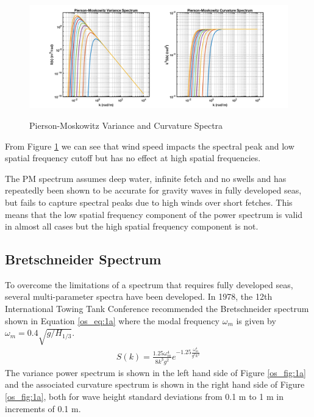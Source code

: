  \begin{figure}[H]
  \begin{center}
\includegraphics[width=6in]{../media/Ocean_Surface/PM_variance_curvature_spectrum.png}
  \end{center}
  \renewcommand{\baselinestretch}{1} \small\normalsize
  \begin{quote}
    \caption[Pierson-Moskowitz Variance and Curvature Spectra]{Pierson-Moskowitz Variance and Curvature Spectra\label{os_fig:1}}
  \end{quote}
\end{figure}
 \renewcommand{\baselinestretch}{2} \small\normalsize
From Figure \ref{os_fig:1} we can see that wind speed impacts the spectral peak and low spatial frequency cutoff but has no effect at high spatial frequencies.
 
The PM spectrum assumes deep water, infinite fetch and no swells and has repeatedly been shown to be accurate for gravity waves in fully developed seas, but fails to capture spectral peaks due to high winds over short fetches. This means that the low spatial frequency component of the power spectrum is valid in almost all cases but the high spatial frequency component is not.

\subsection{Bretschneider Spectrum}
To overcome the limitations of a spectrum that requires fully developed seas, several multi-parameter spectra have been developed. In 1978, the 12th International Towing Tank Conference recommended the Bretschneider spectrum \cite{michel_sea_spectra} shown in Equation \ref{os_eq:1a} where the modal frequency $\omega_m$ is given by $\omega_m = 0.4\sqrt{g/H_{1/3}}$.
\begin{equation}
  \begin{gathered}
  \label{os_eq:1a}
  S(k) = \frac{1.25 \omega_m^4}{8k^3g^2}e^{-1.25\frac{\omega_m^4}{g^2k^2}} 
  \end{gathered}
\end{equation}
\renewcommand{\baselinestretch}{2} \small\normalsize
The variance power spectrum is shown in the left hand side of Figure \ref{os_fig:1a} and the associated curvature spectrum is shown in the right hand side of Figure \ref{os_fig:1a}, both for wave height standard deviations from 0.1 m to 1 m in increments of 0.1 m.

